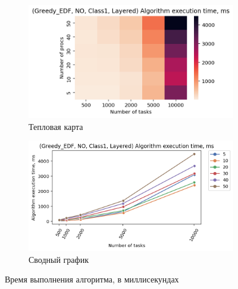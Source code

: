 \begin{figure}[!htbp]
    \centering
    \begin{subfigure}{0.49\textwidth}
        \includegraphics[width=\textwidth]{imgs/layered_class_1/NO_EDF/et_heatmap.png}
        \caption{Тепловая карта}
        \label{fig:NO-layered-EDF-exec-time-heatmap}
    \end{subfigure}
    \hfill
    \begin{subfigure}{0.49\textwidth}
        \includegraphics[width=\textwidth]{imgs/layered_class_1/NO_EDF/tr_graph.png}
        \caption{Сводный график}
        \label{fig:NO-layered-EDF-exec-time-compiled}
    \end{subfigure}
    \caption{Время выполнения алгоритма, в миллисекундах}
\end{figure}

